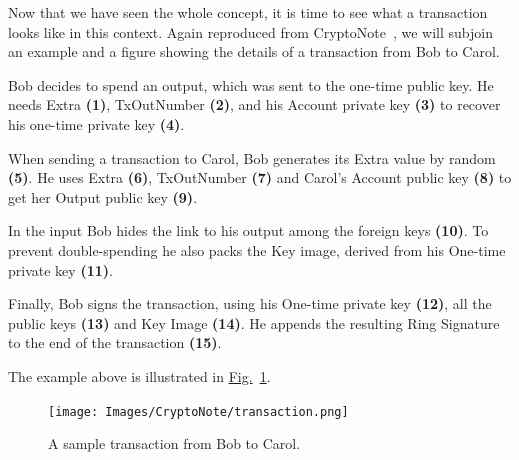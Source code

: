Now that we have seen the whole concept, it is time to see what a transaction looks like in this context. Again reproduced from CryptoNote~\cite{cryptonote}, we will subjoin an example and a figure showing the details of a transaction from Bob to Carol.

Bob decides to spend an output, which was sent to the one-time public key. He needs Extra \textbf{(1)}, TxOutNumber \textbf{(2)}, and his Account private key \textbf{(3)} to recover his one-time private key \textbf{(4)}.

When sending a transaction to Carol, Bob generates its Extra value by random \textbf{(5)}. He uses Extra \textbf{(6)}, TxOutNumber \textbf{(7)} and Carol's Account public key \textbf{(8)} to get her Output public key \textbf{(9)}.

In the input Bob hides the link to his output among the foreign keys \textbf{(10)}. To prevent double-spending he also packs the Key image, derived from his One-time private key \textbf{(11)}.

Finally, Bob signs the transaction, using his One-time private key \textbf{(12)}, all the public keys \textbf{(13)} and Key Image \textbf{(14)}. He appends the resulting Ring Signature to the end of the transaction \textbf{(15)}.

The example above is illustrated in \hyperref[fig:transaction]{Fig.}~\ref{fig:transaction}.\\
\begin{figure}[ht]
  \centering
  \texttt{[image: Images/CryptoNote/transaction.png]}
  \caption{A sample transaction from Bob to Carol.}
  \label{fig:transaction}
\end{figure}
%
